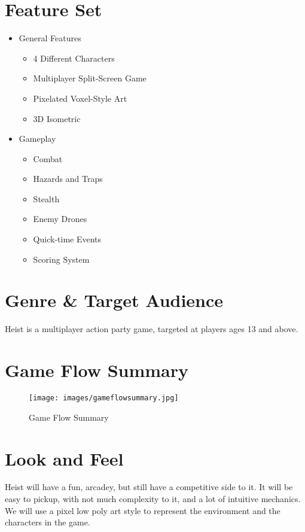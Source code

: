 \documentclass[10pt]{report}
\begin{document}
\section{Feature Set}

\begin{itemize}
    \item General Features
    \begin{itemize}
        \item 4 Different Characters
        \item Multiplayer Split-Screen Game
        \item Pixelated Voxel-Style Art
        \item 3D Isometric
    \end{itemize}
    \item Gameplay
    \begin{itemize}
        \item Combat
        \item Hazards and Traps
        \item Stealth
        \item Enemy Drones
        \item Quick-time Events
        \item Scoring System
    \end{itemize}
\end{itemize}

\section{Genre \& Target Audience}

Heist is a multiplayer action party game, targeted at players ages 13 and above.

\section{Game Flow Summary}

\begin{figure}[H]
	\texttt{[image: images/gameflowsummary.jpg]}
	\caption{Game Flow Summary}
\end{figure}

\section{Look and Feel}

Heist will have a fun, arcadey, but still have a competitive side to it. It will be easy to pickup, with not much complexity to it, and a lot of intuitive mechanics. We will use a pixel low poly art style to represent the environment and the characters in the game.
\end{document}
